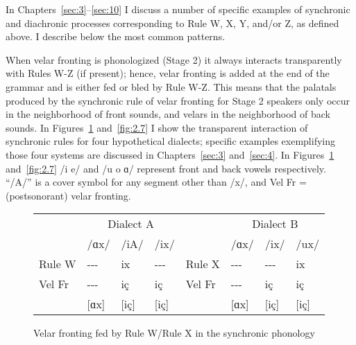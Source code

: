 \begin{xlist}
\begin{xlist}
In Chapters~\ref{sec:3}--\ref{sec:10} I discuss a number of specific examples of synchronic and diachronic processes corresponding to Rule W, X, Y, and/or Z, as defined above. I describe below the most common patterns.

When velar fronting is phonologized (Stage 2) it always interacts transparently with Rules W-Z (if present); hence, velar fronting is added at the end of the grammar and is either fed or bled by Rule W-Z. This means that the palatals produced by the synchronic rule of velar fronting for Stage 2 speakers only occur in the neighborhood of front sounds, and velars in the neighborhood of back sounds. In Figures~\ref{fig:2.6} and~\ref{fig:2.7} I show the transparent interaction of synchronic rules for four hypothetical dialects; specific examples exemplifying those four systems are discussed in Chapters~\ref{sec:3} and~\ref{sec:4}. In Figures~\ref{fig:2.6} and~\ref{fig:2.7} /i e/ and /u o ɑ/ represent front and back vowels respectively.  “/A/” is a cover symbol for any segment other than /x/, and Vel Fr = (postsonorant) velar fronting.\largerpage[-1]

\begin{figure}
\begin{tabular}{llll llll}
         &  \multicolumn{3}{c}{Dialect A}     &         & \multicolumn{3}{c}{Dialect B}\\\cmidrule(lr){2-4}\cmidrule(lr){6-8}
         & /ɑx/        &    /iA/  &   /ix/    &         & /ɑx/       & /ix/      & /ux/\\
  Rule W & {}-{}-{}-   &    ix    & {}-{}-{}- &  Rule X & {}-{}-{}-  & {}-{}-{}- & ix  \\
  Vel Fr & {}-{}-{}-   &    iç    &  iç       &  Vel Fr & {}-{}-{}-  & iç        & iç  \\
         & [ɑx]        &    [iç]  &   [iç]    &         & [ɑx]       & [iç]      & [iç]\\
\end{tabular}
\caption{\label{fig:2.6}Velar fronting fed by Rule W/Rule X in the synchronic phonology}
\end{figure}


\end{xlist}
\end{xlist}
